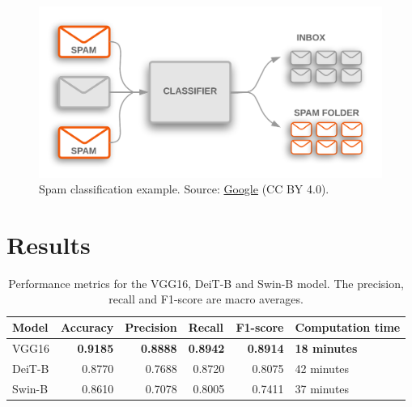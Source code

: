 \documentclass[11pt, a4paper]{article}
\begin{document}
\begin{figure}
    \centering
    \includegraphics[width=\textwidth]{spam.png}
    \caption{Spam classification example. Source: \href{https://developers.google.com/machine-learning/guides/text-classification}{Google} (CC BY 4.0).}
    \label{fig:spam}
\end{figure}

\section{Results}

\begin{table}[]
    
\begin{tabular}{@{}lrrrrl@{}}
\toprule
\textbf{Model} & \multicolumn{1}{l}{\textbf{Accuracy}} & \multicolumn{1}{l}{\textbf{Precision}} & \multicolumn{1}{l}{\textbf{Recall}} & \multicolumn{1}{l}{\textbf{F1-score}} & \textbf{Computation time} \\ \midrule
VGG16          & \textbf{0.9185}                       & \textbf{0.8888}                        & \textbf{0.8942}                     & \textbf{0.8914}                       & \textbf{18 minutes}       \\
DeiT-B         & 0.8770                                & 0.7688                                 & 0.8720                              & 0.8075                                & 42 minutes                \\
Swin-B         & 0.8610                                & 0.7078                                 & 0.8005                              & 0.7411                                & 37 minutes                \\ \bottomrule

\end{tabular}
    \caption{Performance metrics for the VGG16, DeiT-B and Swin-B model. The precision, recall and F1-score are macro averages.}
\end{table}
\end{document}
